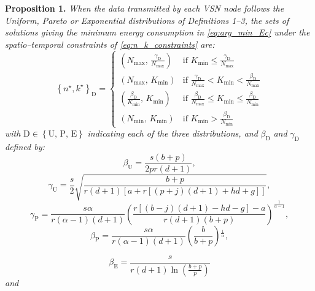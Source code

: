 \documentclass[twocolumn,english]{IEEEtran}
\theoremstyle{plain}
\theoremstyle{definition}
\begin{document}
\textbf{Proposition 1.}\emph{ When the data transmitted by each VSN
node follows the Uniform, Pareto or Exponential distributions of Definitions
1--3, the sets of solutions giving the minimum energy consumption
in \eqref{eq:arg_min_Ec} under the spatio--temporal constraints of
\eqref{eq:n_k_constraints} are:} 
\begin{equation}
\left\{ n^{\star},k^{\star}\right\} _{\text{D}}=\begin{cases}
\left(N_{\text{max}},\,\frac{\gamma_{\textrm{D}}}{N_{\text{max}}}\right) & \text{if}\,\, K_{\text{min}}\le\frac{\gamma_{\textrm{D}}}{N_{\text{max}}}\\
\left(N_{\text{max}},\, K_{\text{min}}\right) & \text{if}\,\,\frac{\gamma_{\textrm{D}}}{N_{\text{max}}}<K_{\text{min}}<\frac{\beta_{\text{D}}}{N_{\max}}\\
\left(\frac{\beta_{\text{D}}}{K_{\min}},\, K_{\text{min}}\right) & \text{if}\,\,\frac{\beta_{\text{D}}}{N_{\max}}\le K_{\text{min}}\le\frac{\beta_{\text{D}}}{N_{\min}}\\
\left(N_{\text{min}},\, K_{\text{min}}\right) & \text{if}\,\, K_{\text{min}}>\frac{\beta_{\text{D}}}{N_{\min}}
\end{cases}\label{eq:uniform_optimal-1}
\end{equation}
\emph{with }$\text{D}\in\left\{ \text{U},\,\text{P},\,\text{E}\right\} $
\emph{indicating each of the three distributions, and }$\beta_{\text{D}}$
\emph{and }$\gamma_{\text{D}}$ \emph{defined by:} 
\begin{equation}
\beta_{\text{U}}=\frac{s\left(b+p\right)}{2pr\left(d+1\right)},\label{eq:beta_U}
\end{equation}
\begin{equation}
\gamma_{\textrm{U}}=\frac{s}{2}\sqrt{\frac{b+p}{r\left(d+1\right)\left[a+r\left[\left(p+j\right)\left(d+1\right)+hd+g\right]\right]}},\label{gamma_U}
\end{equation}
\begin{equation}
\gamma_{\textrm{P}}=\frac{s\alpha}{r(\alpha-1)(d+1)}\left(\frac{r\left[\left(b-j\right)\left(d+1\right)-hd-g\right]-a}{r\left(d+1\right)\left(b+p\right)}\right)^{\frac{1}{\alpha-1}},\label{eq:gamma_P}
\end{equation}
\begin{equation}
\beta_{\text{P}}=\frac{s\alpha}{r\left(\alpha-1\right)\left(d+1\right)}\left(\frac{b}{b+p}\right){}^{\frac{1}{\alpha}},\label{eq:beta_P}
\end{equation}


\begin{equation}
\beta_{\text{E}}=\frac{s}{r(d+1)\ln(\frac{b+p}{p})}\label{eq:beta_E}
\end{equation}
\emph{and}
\end{document}
